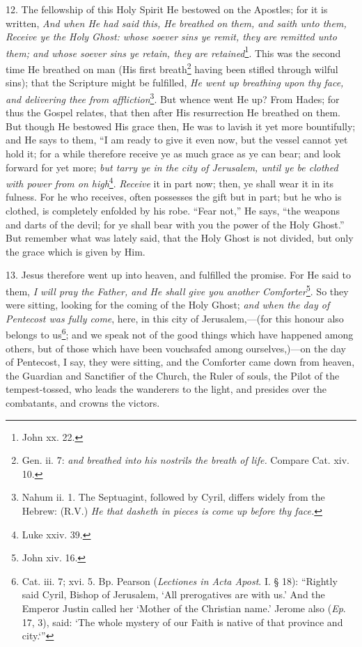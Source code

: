 12. The fellowship of this Holy Spirit He bestowed on the Apostles; for it is written, \emph{And when He had said this, He breathed on them, and saith unto them, Receive ye the Holy Ghost: whose soever sins ye remit, they are remitted unto them; and whose soever sins ye retain, they are retained}\footnote{John xx. 22.}. This was the second time He breathed on man (His first breath\footnote{Gen. ii. 7: \emph{and breathed into his nostrils the breath of life.} Compare Cat. xiv. 10.} having been stifled through wilful sins); that the Scripture might be fulfilled, \emph{He went up breathing upon thy face, and delivering thee from affliction}\footnote{Nahum ii. 1. The Septuagint, followed by Cyril, differs widely from the Hebrew: (\textsc{R.V.}) \emph{He that dasheth in pieces is come up before thy face.}}. But whence went He up? From Hades; for thus the Gospel relates, that then after His resurrection He breathed on them. But though He bestowed His grace then, He was to lavish it yet more bountifully; and He says to them, “I am ready to give it even now, but the vessel cannot yet hold it; for a while therefore receive ye as much grace as ye can bear; and look forward for yet more; \emph{but tarry ye in the city of Jerusalem, until ye be clothed with power from on high}\footnote{Luke xxiv. 39.}. \emph{Receive} it in part now; then, ye shall wear it in its fulness. For he who receives, often possesses the gift but in part; but he who is clothed, is completely enfolded by his robe. “Fear not,” He says, “the weapons and darts of the devil; for ye shall bear with you the power of the Holy Ghost.” But remember what was lately said, that the Holy Ghost is not divided, but only the grace which is given by Him.

13. Jesus therefore went up into heaven, and fulfilled the promise. For He said to them, \emph{I will pray the Father, and He shall give you another Comforter}\footnote{John xiv. 16.}. So they were sitting, looking for the coming of the Holy Ghost; \emph{and when the day of Pentecost was fully come}, here, in this city of Jerusalem,—(for this honour also belongs to us\footnote{Cat. iii. 7; xvi. 5. Bp. Pearson (\emph{Lectiones in Acta Apost}. I. § 18): “Rightly said Cyril, Bishop of Jerusalem, ‘All prerogatives are with us.’ And the Emperor Justin called her ‘Mother of the Christian name.’ Jerome also (\emph{Ep}. 17, 3), said: ‘The whole mystery of our Faith is native of that province and city.‘”}; and we speak not of the good things which have happened among others, but of those which have been vouchsafed among ourselves,)—on the day of Pentecost, I say, they were sitting, and the Comforter came down from heaven, the Guardian and Sanctifier of the Church, the Ruler of souls, the Pilot of the tempest-tossed, who leads the wanderers to the light, and presides over the combatants, and crowns the victors.

